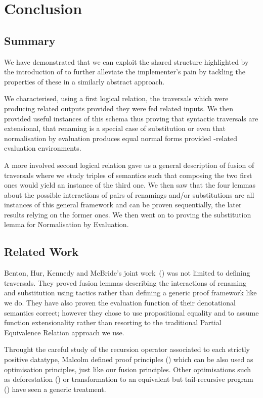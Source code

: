 \chapter{Conclusion}

\section{Summary}

We have demonstrated that we can exploit the shared structure highlighted by the
introduction of  to further alleviate the implementer's pain by
tackling the properties of these  in a similarly abstract approach.

We characterised, using a first logical relation, the traversals which were
producing related outputs provided they were fed related inputs. We then provided
useful instances of this schema thus proving that syntactic traversals are
extensional, that renaming is a special case of substitution or even that
normalisation by evaluation produces equal normal forms provided -related
evaluation environments.

A more involved second logical relation gave us a general description of fusion
of traversals where we study triples of semantics such that composing the two
first ones would yield an instance of the third one. We then saw that the four
lemmas about the possible interactions of pairs of renamings and/or substitutions
are all instances of this general framework and can be proven sequentially, the
later results relying on the former ones. We then went on to proving the
substitution lemma for Normalisation by Evaluation.

\section{Related Work}

Benton, Hur, Kennedy and McBride's joint work~(\citeyear{benton2012strongly}) was not
limited to defining traversals. They proved fusion lemmas describing the interactions
of renaming and substitution using tactics rather than defining a generic proof framework
like we do. They have also proven the evaluation function of their denotational semantics
correct; however they chose to use propositional equality and to assume function
extensionality rather than resorting to the traditional Partial Equivalence Relation
approach we use.

Throught the careful study of the recursion operator associated to each strictly positive
datatype, Malcolm defined proof principles (\cite{DBLP:journals/scp/Malcolm90}) which can
be also used as optimisation principles, just like our fusion principles. Other
optimisations such as deforestation (\cite{wadler1990deforestation}) or transformation
to an equivalent but tail-recursive program (\cite{TomeCortinas:2018:AAM:3240719.3241787})
have seen a generic treatment.


